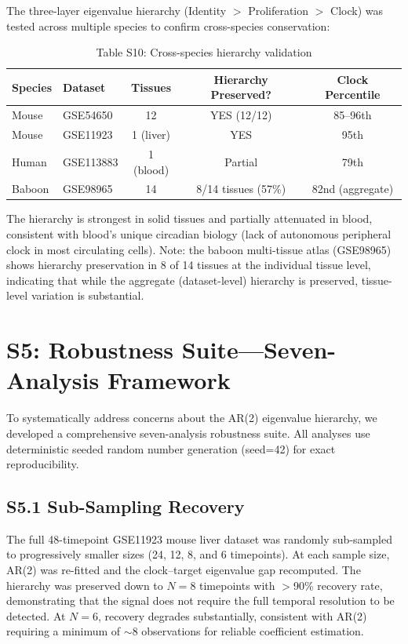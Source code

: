 \documentclass[11pt,a4paper]{article}
\begin{document}
The three-layer eigenvalue hierarchy (Identity $>$ Proliferation $>$ Clock) was tested across multiple species to confirm cross-species conservation:

\begin{table}[H]
\centering
\caption{Table S10: Cross-species hierarchy validation}
\begin{tabular}{llccc}
\toprule
Species & Dataset & Tissues & Hierarchy Preserved? & Clock Percentile \\
\midrule
Mouse & GSE54650 & 12 & YES (12/12) & 85--96th \\
Mouse & GSE11923 & 1 (liver) & YES & 95th \\
Human & GSE113883 & 1 (blood) & Partial & 79th \\
Baboon & GSE98965 & 14 & 8/14 tissues (57\%) & 82nd (aggregate) \\
\bottomrule
\end{tabular}
\end{table}

The hierarchy is strongest in solid tissues and partially attenuated in blood, consistent with blood's unique circadian biology (lack of autonomous peripheral clock in most circulating cells). Note: the baboon multi-tissue atlas (GSE98965) shows hierarchy preservation in 8 of 14 tissues at the individual tissue level, indicating that while the aggregate (dataset-level) hierarchy is preserved, tissue-level variation is substantial.

\section{S5: Robustness Suite---Seven-Analysis Framework}

To systematically address concerns about the AR(2) eigenvalue hierarchy, we developed a comprehensive seven-analysis robustness suite. All analyses use deterministic seeded random number generation (seed=42) for exact reproducibility.

\subsection{S5.1 Sub-Sampling Recovery}

The full 48-timepoint GSE11923 mouse liver dataset was randomly sub-sampled to progressively smaller sizes (24, 12, 8, and 6 timepoints). At each sample size, AR(2) was re-fitted and the clock--target eigenvalue gap recomputed. The hierarchy was preserved down to $N=8$ timepoints with $>$90\% recovery rate, demonstrating that the signal does not require the full temporal resolution to be detected. At $N=6$, recovery degrades substantially, consistent with AR(2) requiring a minimum of $\sim$8 observations for reliable coefficient estimation.
\end{document}
